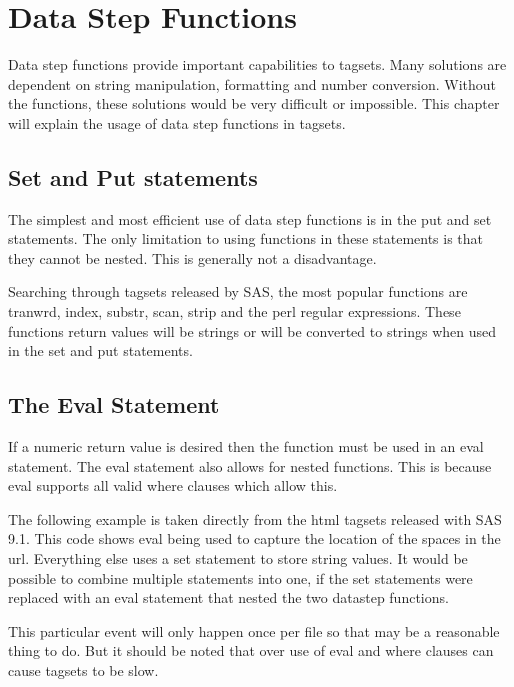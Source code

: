 \chapter{Data Step Functions}
Data step functions provide important capabilities to tagsets.  Many
solutions are dependent on string manipulation, formatting and 
number conversion.  Without the functions, these solutions would
be very difficult or impossible.  This chapter will explain the usage
of data step functions in tagsets.


\section{Set and Put statements}
The simplest and most efficient use of data step functions is in
the put and set statements.  The only limitation to using functions
in these statements is that they cannot be nested.  This is generally
not a disadvantage.  

Searching through tagsets released by SAS, the most
popular functions are tranwrd, index, substr, scan, strip and
the perl regular expressions.  These functions return values will
be strings or will be converted to strings when used in the set 
and put statements.  



\section{The Eval Statement}
If a numeric return value is desired then the function must be used in
an eval statement.  The eval statement also allows for nested functions.
This is because eval supports all valid where clauses which allow this.

The following example is taken directly from the html tagsets released with SAS 9.1.
This code shows eval being used to capture the location of the spaces in
the url.  Everything else uses a set statement to store string values. It
would be possible to combine multiple statements into one, if the set statements
were replaced with an eval statement that nested the two datastep functions.

This particular event will only happen once per file so that may be a reasonable
thing to do.  But it should be noted that over use of eval and where clauses
can cause tagsets to be slow.

